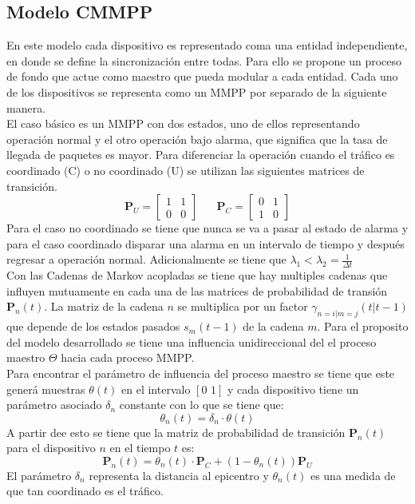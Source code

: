 \documentclass[journal]{IEEEtran}
\begin{document}
\subsection{Modelo CMMPP}
En este modelo cada dispositivo es representado coma una entidad independiente, en donde se define la sincronizaci\'on entre todas. Para ello se propone un proceso de fondo que actue como maestro que pueda modular a cada entidad. Cada uno de los dispositivos se representa como un MMPP por separado de la siguiente manera.\\

El caso b\'asico es un MMPP con dos estados, uno de ellos representando operaci\'on normal y el otro operaci\'on bajo alarma, que significa que la tasa de llegada de paquetes es mayor. Para diferenciar la operaci\'on cuando el tr\'afico es coordinado (C) o no coordinado (U) se utilizan las siguientes matrices de transici\'on.
$$\mathbf{P}_U=\left[\begin{array}{cc}
1 & 1\\
0 & 0
\end{array}\right]\hspace{20pt}\mathbf{P}_C=\left[\begin{array}{cc}
0 & 1\\
1 & 0
\end{array}\right]
$$
Para el caso no coordinado se tiene que nunca se va a pasar al estado de alarma y para el caso coordinado disparar una alarma en un intervalo de tiempo y despu\'es regresar a operaci\'on normal. Adicionalmente se tiene que $\lambda_1<\lambda_2=\frac{1}{\Delta t}$\\

Con las Cadenas de Markov acopladas se tiene que hay multiples cadenas que influyen mutuamente en cada una de las matrices de probabilidad de transi\'on $\mathbf{P}_n(t)$. La matriz de la cadena $n$ se multiplica por un factor $\gamma_{n=i|m=j}(t|t-1)$ que depende de los estados pasados $s_m(t-1)$ de la cadena $m$. Para el proposito del modelo desarrollado se tiene una influencia unidireccional del el proceso maestro $\Theta$ hacia cada proceso MMPP.\\

Para encontrar el par\'ametro de influencia del proceso maestro se tiene que este gener\'a muestras $\theta(t)$ en el intervalo $[0\hspace{4pt}1]$ y cada dispositivo tiene un par\'ametro asociado $\delta_n$ constante con lo que se tiene que:
$$\theta_n(t)=\delta_n\cdot\theta(t)$$
A partir dee esto se tiene que la matriz de probabilidad de transici\'on $\mathbf{P}_n(t)$ para el dispositivo $n$ en el tiempo $t$ es:
$$\mathbf{P}_n(t)=\theta_n(t)\cdot \mathbf{P}_C+(1-\theta_n(t))\mathbf{P}_U$$
El par\'ametro $\delta_n$ representa la distancia al epicentro y $\theta_n(t)$ es una medida de que tan coordinado es el tr\'afico.
\end{document}
